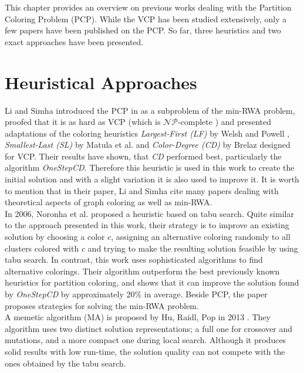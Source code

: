 This chapter provides an overview on previous works dealing with the Partition Coloring Problem (PCP). While the VCP has been studied extensively, only a few papers have been published on the PCP. So far, three heuristics and two exact approaches have been presented.

\section{Heuristical Approaches}
Li and Simha introduced the PCP in \cite{li-00} as a subproblem of the min-RWA problem, proofed that it is as hard as VCP (which is $\mathcal{NP}$-complete \cite{karp-72}) and presented adaptations of the coloring heuristics \textit{Largest-First (LF)} by Welsh and Powell \cite{welsh-67}, \textit{Smallest-Last (SL)} by Matula et al. \cite{matula-72} and \textit{Color-Degree (CD)} by Brelaz \cite{brelaz-79} designed for VCP. Their results have shown, that \textit{CD} performed best, particularly the algorithm \textit{OneStepCD}. Therefore this heuristic is used in this work to create the initial solution and with a slight variation it is also used to improve it. It is worth to mention that in their paper, Li and Simha cite many papers dealing with theoretical aspects of graph coloring as well as min-RWA.\\
In 2006, Noronha et al. \cite{noronha-06} proposed a heuristic based on tabu search. Quite similar to the approach presented in this work, their strategy is to improve an existing solution by choosing a color $c$, assigning an alternative coloring randomly to all clusters colored with $c$ and trying to make the resulting solution feasible by using tabu search. In contrast, this work uses sophisticated algorithms to find alternative colorings. Their algorithm outperform the best previously known heuristics for partition coloring, and shows that it can improve the solution found by \textit{OneStepCD} by approximately 20\% in average. Beside PCP, the paper proposes  strategies for solving the min-RWA problem.\\
A memetic algorithm (MA) is proposed by Hu, Raidl, Pop in 2013 \cite{pop-12}. They algorithm uses two distinct solution representations; a full one for crossover and mutations, and a more compact one during local search. Although it produces solid results with low run-time, the solution quality can not compete with the ones obtained by the tabu search.


